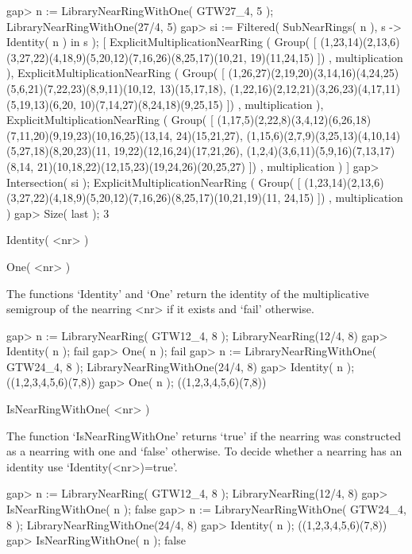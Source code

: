 \beginexample
    gap> n := LibraryNearRingWithOne( GTW27_4, 5 );
    LibraryNearRingWithOne(27/4, 5)
    gap> si := Filtered( SubNearRings( n ), s -> Identity( n ) in s );
    [ ExplicitMultiplicationNearRing ( Group(
        [ (1,23,14)(2,13,6)(3,27,22)(4,18,9)(5,20,12)(7,16,26)(8,25,17)(10,21,
            19)(11,24,15) ]) , multiplication ),
      ExplicitMultiplicationNearRing ( Group(
        [ (1,26,27)(2,19,20)(3,14,16)(4,24,25)(5,6,21)(7,22,23)(8,9,11)(10,12,
            13)(15,17,18), (1,22,16)(2,12,21)(3,26,23)(4,17,11)(5,19,13)(6,20,
            10)(7,14,27)(8,24,18)(9,25,15) ]) , multiplication ),
      ExplicitMultiplicationNearRing ( Group(
        [ (1,17,5)(2,22,8)(3,4,12)(6,26,18)(7,11,20)(9,19,23)(10,16,25)(13,14,
            24)(15,21,27), (1,15,6)(2,7,9)(3,25,13)(4,10,14)(5,27,18)(8,20,23)(11,
            19,22)(12,16,24)(17,21,26), (1,2,4)(3,6,11)(5,9,16)(7,13,17)(8,14,
            21)(10,18,22)(12,15,23)(19,24,26)(20,25,27) ]) , multiplication ) ]
    gap> Intersection( si );
    ExplicitMultiplicationNearRing ( Group(
    [ (1,23,14)(2,13,6)(3,27,22)(4,18,9)(5,20,12)(7,16,26)(8,25,17)(10,21,19)(11,
        24,15) ]) , multiplication )
    gap> Size( last );
    3
\endexample



\>Identity( <nr> )

\>One( <nr> )

The functions `Identity' and `One' return the identity of the multiplicative
semigroup of the nearring <nr> if it exists and `fail' otherwise.

\beginexample
    gap> n := LibraryNearRing( GTW12_4, 8 );            
    LibraryNearRing(12/4, 8)
    gap> Identity( n );
    fail
    gap> One( n );
    fail
    gap> n := LibraryNearRingWithOne( GTW24_4, 8 ); 
    LibraryNearRingWithOne(24/4, 8)
    gap> Identity( n );
    ((1,2,3,4,5,6)(7,8))
    gap> One( n );
    ((1,2,3,4,5,6)(7,8))
\endexample

\>IsNearRingWithOne( <nr> )

The function `IsNearRingWithOne' returns `true' if the nearring was
constructed as a nearring with one and `false' otherwise. To decide
whether a nearring has an identity use `Identity(<nr>)=true'.

\beginexample
    gap> n := LibraryNearRing( GTW12_4, 8 );             
    LibraryNearRing(12/4, 8)
    gap> IsNearRingWithOne( n );
    false
    gap> n := LibraryNearRingWithOne( GTW24_4, 8 ); 
    LibraryNearRingWithOne(24/4, 8)
    gap> Identity( n );
    ((1,2,3,4,5,6)(7,8))
    gap> IsNearRingWithOne( n );
    false
\endexample

